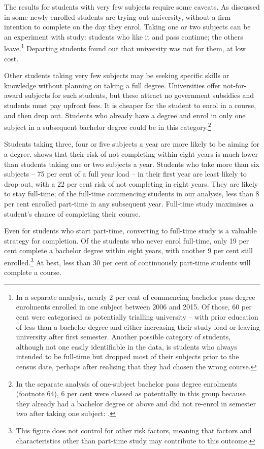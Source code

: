 The results for students with very few subjects require some caveats. As discussed in  some newly-enrolled students are trying out university, without a firm intention to complete on the day they enrol. Taking one or two subjects can be an experiment with study: students who like it and pass continue; the others leave.\footnote{In a separate analysis, nearly 2 per cent of commencing bachelor pass degree enrolments enrolled in one subject between 2006 and 2015. Of those, 60 per cent were categorised as potentially trialling university -- with prior education of less than a bachelor degree and either increasing their study load or leaving university after first semester. Another possible category of students, although not one easily identifiable in the data, is students who always intended to be full-time but dropped most of their subjects prior to the census date, perhaps after realising that they had chosen the wrong course.} Departing students found out that university was not for them, at low cost.

Other students taking very few subjects may be seeking specific skills or knowledge without planning on taking a full degree. Universities offer not-for-award subjects for such students, but these attract no government subsidies and students must pay upfront fees. It is cheaper for the student to enrol in a course, and then drop out. Students who already have a degree and enrol in only one subject in a subsequent bachelor degree could be in this category.\footnote{In the separate analysis of one-subject bachelor pass degree enrolments (footnote 64), 6 per cent were classed as potentially in this group because they already had a bachelor degree or above and did not re-enrol in semester two after taking one subject: \textcite{DepartmentofEducationandTraininga}.}

Students taking three, four or five subjects a year are more likely to be aiming for a degree.  shows that their risk of not completing within eight years is much lower than students taking one or two subjects a year. Students who take more than six subjects -- 75 per cent of a full year load -- in their first year are least likely to drop out, with a 22 per cent risk of not completing in eight years. They are likely to stay full-time; of the full-time commencing students in our analysis, less than 8 per cent enrolled part-time in any subsequent year. Full-time study maximises a student's chance of completing their course.

Even for students who start part-time, converting to full-time study is a valuable strategy for completion. Of the students who never enrol full-time, only 19 per cent complete a bachelor degree within eight years, with another 9 per cent still enrolled.\footnote{This figure does not control for other risk factors, meaning that factors and characteristics other than part-time study may contribute to this outcome.} At best, less than 30 per cent of continuously part-time students will complete a course.



